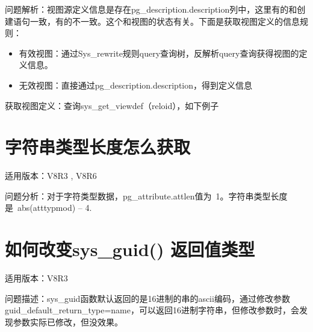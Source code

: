 \documentclass[a4,10pt,oneside,english]{sphinxmanual}
\begin{document}
问题解析：视图源定义信息是存在pg\_description.description列中，这里有的和创建语句一致，有的不一致。这个和视图的状态有关。下面是获取视图定义的信息规则：
\begin{itemize}
\item {} 
有效视图：通过Sys\_rewrite规则query查询树，反解析query查询获得视图的定义信息。

\item {} 
无效视图：直接通过pg\_description.description，得到定义信息

\end{itemize}

获取视图定义：查询sys\_get\_viewdef（reloid），如下例子

\begin{sphinxVerbatim}[commandchars=\\\{\}]
      
 
 
    
\end{sphinxVerbatim}


\section{字符串类型长度怎么获取}
\label{\detokenize{sql:id19}}
适用版本：V8R3 , V8R6

问题分析：对于字符类型数据，pg\_attribute.attlen值为 \sphinxhyphen{}1。字符串类型长度是 abs(atttypmod) – 4.


\section{如何改变sys\_guid() 返回值类型}
\label{\detokenize{sql:sys-guid}}
适用版本：V8R3

问题描述：sys\_guid函数默认返回的是16进制的串的ascii编码，通过修改参数guid\_default\_return\_type=name，可以返回16进制字符串，但修改参数时，会发现参数实际已修改，但没效果。
\end{document}
